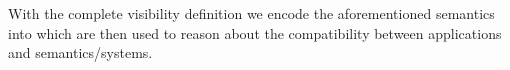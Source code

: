   With the complete visibility definition we encode the aforementioned semantics
  into \sysname{} which are then used to reason about the compatibility
  between applications and semantics/systems.



